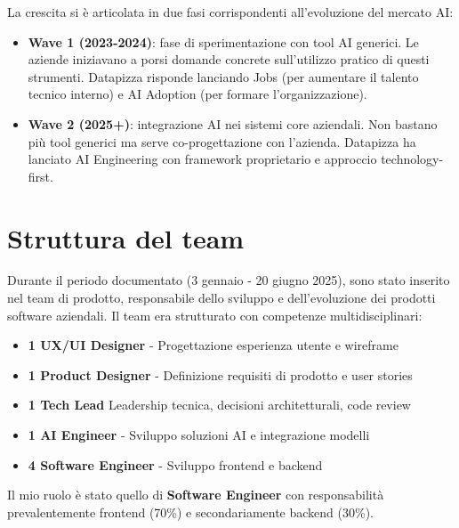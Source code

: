 La crescita si è articolata in due fasi corrispondenti all'evoluzione del mercato AI:
\begin{itemize}
  \item \textbf{Wave 1 (2023-2024)}: fase di sperimentazione con tool 
        AI generici. Le aziende iniziavano a porsi domande concrete 
        sull'utilizzo pratico di questi strumenti. Datapizza risponde 
        lanciando Jobs (per aumentare il talento tecnico interno) e AI 
        Adoption (per formare l'organizzazione).
  
  \item \textbf{Wave 2 (2025+)}: integrazione AI nei sistemi core 
        aziendali. Non bastano più tool generici ma serve co-progettazione 
        con l'azienda. Datapizza ha lanciato AI Engineering con framework 
        proprietario e approccio technology-first.
\end{itemize}

\section{Struttura del team}
Durante il periodo documentato (3 gennaio - 20 giugno 2025), sono stato inserito nel team di prodotto, responsabile dello sviluppo e dell'evoluzione dei prodotti software aziendali. Il team era strutturato con competenze multidisciplinari:

\begin{itemize}
  \item \textbf{1 UX/UI Designer} - Progettazione esperienza utente e wireframe
  \item \textbf{1 Product Designer} - Definizione requisiti di prodotto e user stories
  \item \textbf{1 Tech Lead} Leadership tecnica, decisioni architetturali, code review
  \item \textbf{1 AI Engineer} - Sviluppo soluzioni AI e integrazione modelli
  \item \textbf{4 Software Engineer} - Sviluppo frontend e backend
\end{itemize}

Il mio ruolo è stato quello di \textbf{Software Engineer} con responsabilità prevalentemente frontend (70\%) e secondariamente backend (30\%).